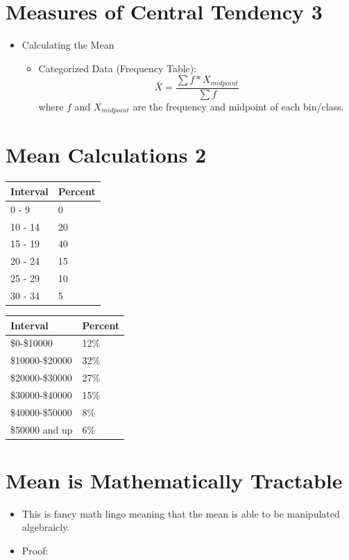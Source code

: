 \documentclass[12pt]{article}
\begin{document}
\section{Measures of Central Tendency
3}\label{measures-of-central-tendency-3-2}

\begin{itemize}
\itemsep1pt\parskip0pt
\item
  Calculating the Mean

  \begin{itemize}
  \itemsep1pt\parskip0pt
  \item
    Categorized Data (Frequency Table):
    \[ \bar{X} = \frac{\sum f * X_{midpoint}}{\sum f} \] where \(f\) and
    \(X_{midpoint}\) are the frequency and midpoint of each bin/class.
  \end{itemize}
\end{itemize}

\section{Mean Calculations 2}\label{mean-calculations-2}
\begin{multicols}{2}
\begin{longtable}[c]{@{}ll@{}}
\toprule
Interval & Percent\tabularnewline
\midrule
\endhead
0 - 9 & 0\tabularnewline
10 - 14 & 20\tabularnewline
15 - 19 & 40\tabularnewline
20 - 24 & 15\tabularnewline
25 - 29 & 10\tabularnewline
30 - 34 & 5\tabularnewline
\bottomrule
\end{longtable}

\columnbreak
\begin{longtable}[c]{@{}ll@{}}
\toprule
Interval & Percent\tabularnewline
\midrule
\endhead
\$0-\$10000 & 12\%\tabularnewline
\$10000-\$20000 & 32\%\tabularnewline
\$20000-\$30000 & 27\%\tabularnewline
\$30000-\$40000 & 15\%\tabularnewline
\$40000-\$50000 & 8\%\tabularnewline
\$50000 and up & 6\%\tabularnewline
\bottomrule
\end{longtable}
\end{multicols}

\newpage
\section{Mean is Mathematically
Tractable}\label{mean-is-mathematically-tractable}

\begin{itemize}
\itemsep1pt\parskip0pt
\item
  This is fancy math lingo meaning that the mean is able to be
  manipulated algebraicly.
\item
  Proof:
\end{itemize}
\end{document}
